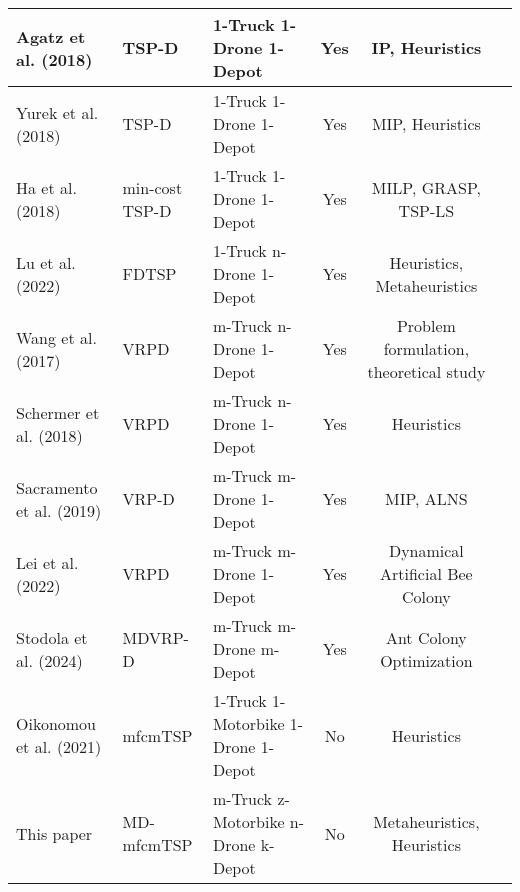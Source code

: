\begin{table*}[]
{\begin{tabular}{@{}lllccl@{}}
			Agatz et al. (2018) & TSP-D & 1-Truck 1-Drone 1-Depot & Yes & IP, Heuristics \\
			\midrule
			Yurek et al. (2018) & TSP-D & 1-Truck 1-Drone 1-Depot & Yes & MIP, Heuristics \\
			\midrule
			Ha et al. (2018) & min-cost TSP-D & 1-Truck 1-Drone 1-Depot & Yes & MILP, GRASP, TSP-LS \\
			\midrule
			Lu et al. (2022) & FDTSP & 1-Truck n-Drone 1-Depot & Yes & Heuristics, Metaheuristics \\
			\midrule
			Wang et al. (2017) & VRPD & m-Truck n-Drone 1-Depot & Yes & Problem formulation, theoretical study \\
			\midrule
			Schermer et al. (2018) & VRPD & m-Truck n-Drone 1-Depot & Yes & Heuristics \\
			\midrule
			Sacramento et al. (2019) & VRP-D & m-Truck m-Drone 1-Depot & Yes & MIP, ALNS \\
			\midrule
			Lei et al. (2022) & VRPD & m-Truck m-Drone 1-Depot & Yes & Dynamical Artificial Bee Colony \\
			\midrule
			Stodola et al. (2024) & MDVRP-D & m-Truck m-Drone m-Depot & Yes & Ant Colony Optimization \\
			\midrule
			Oikonomou et al. (2021) & mfcmTSP & 1-Truck 1-Motorbike 1-Drone 1-Depot & No & Heuristics \\
			\midrule
			This paper & MD-mfcmTSP & m-Truck z-Motorbike n-Drone k-Depot & No & Metaheuristics, Heuristics \\
			\bottomrule
		\end{tabular}%
	}
\end{table*}